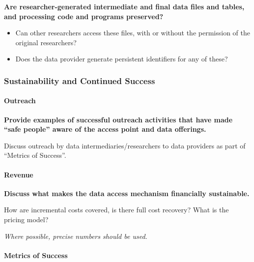 \documentclass[
]{WileySix}
\providecommand{\tightlist}{%
  \setlength{\itemsep}{0pt}\setlength{\parskip}{0pt}}
\begin{document}
\textbf{Are researcher-generated intermediate and final data files and tables, and processing code and programs preserved?}

\begin{itemize}
\tightlist
\item
  Can other researchers access these files, with or without the permission of the original researchers?
\item
  Does the data provider generate persistent identifiers for any of these?
\end{itemize}

\hypertarget{sustainability-and-continued-success-9}{%
\subsubsection*{Sustainability and Continued Success}\label{sustainability-and-continued-success-9}}

\hypertarget{outreach-7}{%
\paragraph{Outreach}\label{outreach-7}}

\textbf{Provide examples of successful outreach activities that have made ``safe people'' aware of the access point and data offerings.}

Discuss outreach by data intermediaries/researchers to data providers as part of ``Metrics of Success''.

\hypertarget{revenue-7}{%
\paragraph{Revenue}\label{revenue-7}}

\textbf{Discuss what makes the data access mechanism financially sustainable.}

How are incremental costs covered, is there full cost recovery? What is the pricing model?

\emph{Where possible, precise numbers should be used.}

\hypertarget{metrics-of-success-7}{%
\paragraph{Metrics of Success}\label{metrics-of-success-7}}
\end{document}
